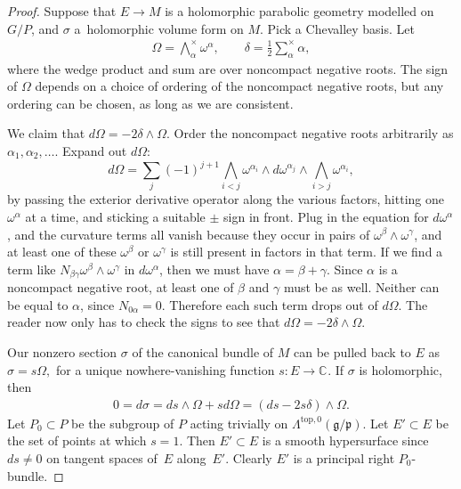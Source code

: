 \documentclass[pdftex]{sigma}
\newcommand{\C}[1]{\ensuremath{\mathbb{C}^{#1}}}
\newcommand{\Gtot}{\ensuremath{G}}
\newcommand{\Gstruc}{P}
\begin{document}
\begin{proof}
Suppose that $E \to M$ is a holomorphic parabolic
geometry modelled on $\Gtot/\Gstruc$,
and $\sigma$ a~holomorphic volume form on $M$.
Pick a Chevalley basis. Let
\begin{gather*}
\Omega  = \bigwedge^{\times}_{\alpha} \omega^{\alpha}, \qquad
\delta  = \frac{1}{2} \sum^{\times}_{\alpha} \alpha,
\end{gather*}
where the wedge product and sum are over noncompact negative roots.
The sign of $\Omega$ depends on a choice of ordering
of the noncompact negative roots, but any ordering can be chosen, as
long as we are consistent.

We claim that $d \Omega = - 2 \delta \wedge \Omega$.
Order the noncompact negative
roots arbitrarily as $\alpha_1, \alpha_2, \dots$.
Expand out $d \Omega$:
\[
d \Omega
=
 \sum_{j}
(-1)^{j+1}
\bigwedge_{i < j} \omega^{\alpha_i}
\wedge d \omega^{\alpha_j}
\wedge
\bigwedge_{i > j} \omega^{\alpha_i},
\]
by passing the exterior derivative operator along
the various factors, hitting one $\omega^{\alpha}$
at a time, and sticking a suitable $\pm$ sign in front.
Plug in the equation for $d \omega^{\alpha}$,
and the curvature terms all vanish because they
occur in pairs of $\omega^{\beta} \wedge \omega^{\gamma}$,
and at least one of these $\omega^{\beta}$ or $\omega^{\gamma}$
is still present in factors in that term.
If we f\/ind a term like $N_{\beta \gamma} \omega^{\beta}
\wedge \omega^{\gamma}$ in $d \omega^{\alpha}$,
then we must have $\alpha=\beta+\gamma$.
Since $\alpha$ is a noncompact negative root, at least one
of $\beta$ and $\gamma$ must be as well. Neither can be
equal to $\alpha$, since $N_{0\alpha}=0$. Therefore
each such term drops out of $d \Omega$. The reader
now only has to check the signs to see that
$d \Omega = -2 \delta \wedge \Omega$.

Our nonzero section $\sigma$ of the canonical
bundle of $M$ can be pulled back to $E$ as
\(
\sigma = s \Omega,
\)
for a unique nowhere-vanishing function $s : E \to \C{}$.
If $\sigma$ is holomorphic, then
\begin{gather*}
0  =
d\sigma
 =
ds \wedge \Omega + s   d \Omega
=
\left(ds - 2 s \delta \right) \wedge \Omega.
\end{gather*}
Let $P_0 \subset P$ be the subgroup of $P$
acting trivially on
$\Lambda^{\text{top},0}\left(\mathfrak{g}/\mathfrak{p}\right)$.
Let $E' \subset E$ be the set of points at which
$s=1$. Then $E' \subset E$ is a smooth hypersurface since $ds \ne 0$
on tangent spaces of~$E$ along~$E'.$ Clearly
$E'$ is a principal right $P_0$-bundle.


\end{proof}
\end{document}
